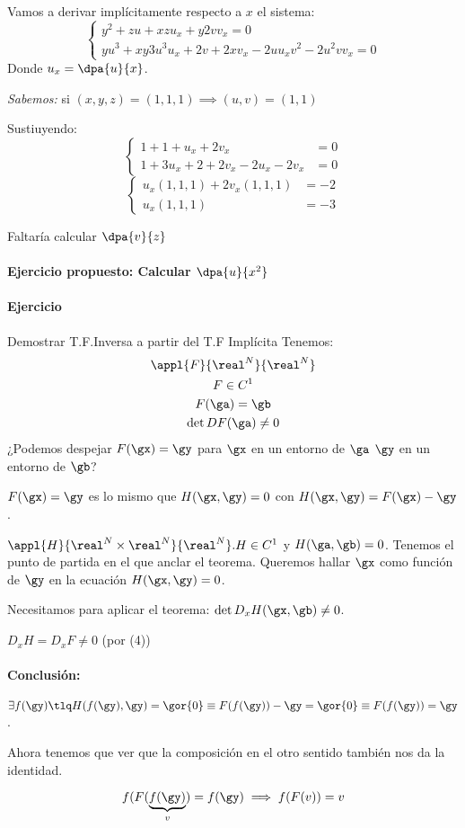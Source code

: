 Vamos a derivar implícitamente respecto a $x$ el sistema:
\[\left\{\begin{matrix} y^2+zu+xzu_x + y 2v v_x = 0 \\ yu^3+xy3u^3u_x  + 2v + 2xv_x - 2uu_xv^2-2u^2vv_x = 0 \end{matrix}\right.\]
Donde $u_x = \dpa{u}{x}$.

\emph{Sabemos:} si $(x,y,z) = (1,1,1) \implies (u,v) = (1,1)$

Sustiuyendo:
\[\left\{\begin{matrix}1+1+u_x+2v_x &= 0 \\ 1+3u_x+2+2v_x-2u_x-2v_x &= 0\end{matrix}\right.\]
\[\left\{\begin{matrix}u_x(1,1,1) + 2v_x(1,1,1) &= -2\\ u_x(1,1,1) &= -3 \end{matrix}\right.\]

Faltaría  calcular $\dpa{v}{z}$

\paragraph{Ejercicio propuesto: Calcular $\dpa{u}{x^2}$}

\paragraph{Ejercicio} Demostrar T.F.Inversa a partir del T.F Implícita
Tenemos:
\begin{gather}
 \appl{F}{\real^N}{\real^N}\\
 F\in C^1\\
 F(\ga) = \gb\\
 \det DF(\ga) \neq 0
\end{gather}
¿Podemos despejar $F(\gx) = \gy$ para $\gx$ en un entorno de $\ga$ $\gy$ en un entorno de $\gb$?

$F(\gx) = \gy$ es lo mismo que $H(\gx,\gy) = 0$ con $H(\gx,\gy) = F(\gx)-\gy$.

$\appl{H}{\real^N\times \real^N}{\real^N}. H\in C^1$ y $H(\ga,\gb) = 0$. Tenemos el punto de partida en el que anclar el teorema. Queremos hallar $\gx$ como función de $\gy$ en la ecuación $H(\gx,\gy) = 0$.

Necesitamos para aplicar el teorema: $\det D_x H(\gx,\gb) \neq 0$.

\obs $D_x H  = D_x F \neq 0$ (por (4))

\paragraph{Conclusión:} $\exists f(\gy) \tlq H(f(\gy),\gy) = \gor{0} \equiv F(f(\gy)) - \gy = \gor{0} \equiv F(f(\gy)) = \gy$.

Ahora tenemos que ver que la composición en el otro sentido también nos da la identidad.

\[f(F(\underbrace{f(\gy)}_{v}) = f(\gy) \implies f(F(v)) = v\]
